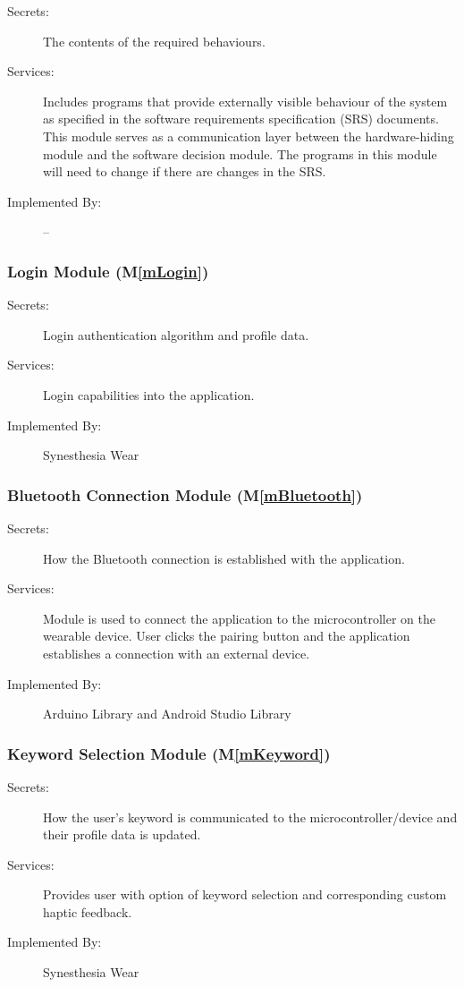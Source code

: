 \documentclass[12pt, titlepage]{article}
\newcommand{\mref}[1]{M\ref{#1}}
\begin{document}
\begin{description}
\item[Secrets:]The contents of the required behaviours.
\item[Services:]Includes programs that provide externally visible behaviour of
  the system as specified in the software requirements specification (SRS)
  documents. This module serves as a communication layer between the
  hardware-hiding module and the software decision module. The programs in this
  module will need to change if there are changes in the SRS.
\item[Implemented By:] --
\end{description}

\subsubsection{Login Module (\mref{mLogin})}
\begin{description}
\item[Secrets:] Login authentication algorithm and profile data. 
\item[Services:] Login capabilities into the application.
\item[Implemented By:] Synesthesia Wear
\end{description}

\subsubsection{Bluetooth Connection Module (\mref{mBluetooth})}
\begin{description}
  \item[Secrets:] How the Bluetooth connection is established with the application.
  \item[Services:] Module is used to connect the application to the microcontroller on the wearable device. User clicks the pairing button and the application establishes a connection with an external device.
  \item[Implemented By:] Arduino Library and Android Studio Library
  \end{description}

\subsubsection{Keyword Selection Module (\mref{mKeyword})}
\begin{description}
  \item[Secrets:] How the user’s keyword is communicated to the microcontroller/device and their profile data is updated.
  \item[Services:] Provides user with option of keyword selection and corresponding custom haptic feedback.
  \item[Implemented By:] Synesthesia Wear
  \end{description}
\end{document}
